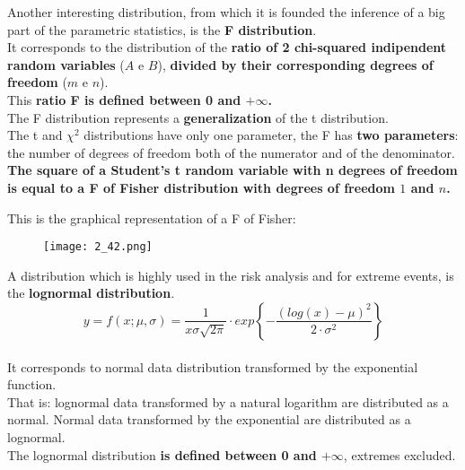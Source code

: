 
\begin{frame}
  Another interesting distribution, from which it is founded the inference of a big part of the parametric statistics, is the \textbf{F distribution}.\\
  \vspace*{.2cm}
  It corresponds to the distribution of the \textbf{ratio of 2 chi-squared indipendent random variables} ($ A $ e $ B $), \textbf{divided by their corresponding degrees of freedom} ($ m $ e $ n $).\\
  \vspace*{.2cm}
  This \textbf{ratio F is defined between 0 and {\boldmath $ +\infty $}.}\\
  \vspace*{.2cm}
  The F distribution represents a \textbf{generalization} of the t distribution.\\
  \vspace*{.2cm}
  The t and $ \chi^2 $ distributions have only one parameter, the F has \textbf{two parameters}: the number of degrees of freedom both of the numerator and of the denominator.\\
  \vspace*{.2cm}
  \textbf{The square of a Student's t random variable with n degrees of freedom is equal to a F of Fisher distribution with degrees of freedom {\boldmath $ 1 $} and {\boldmath $ n $}.}
\end{frame}

\begin{frame}
\vspace*{.5cm}
\centering
This is the graphical representation of a F of Fisher:\\
\begin{figure}
\texttt{[image: 2\_42.png]}
\end{figure}
\end{frame}


\begin{frame}
  \vspace*{.25cm}
  A distribution which is highly used in the risk analysis and for extreme events, is the \textbf{lognormal distribution}. \\
  \vspace*{.35cm}
  $$ y = f(x; \mu, \sigma) = \frac{1}{x\sigma\sqrt{2\pi}}\cdot exp\left\{-\frac{(log(x)-\mu)^2}{2\cdot \sigma^2}\right\} $$ \\
  \vspace*{.35cm}
  It corresponds to normal data distribution transformed by the exponential function. \\
  \vspace*{.35cm}
  That is: lognormal data transformed by a natural logarithm are distributed as a normal. Normal data transformed by the exponential are distributed as a lognormal.\\
  \vspace*{.35cm}
  The lognormal distribution \textbf{is defined between 0 and {\boldmath$+\infty$}}, extremes excluded. \\
\end{frame}

